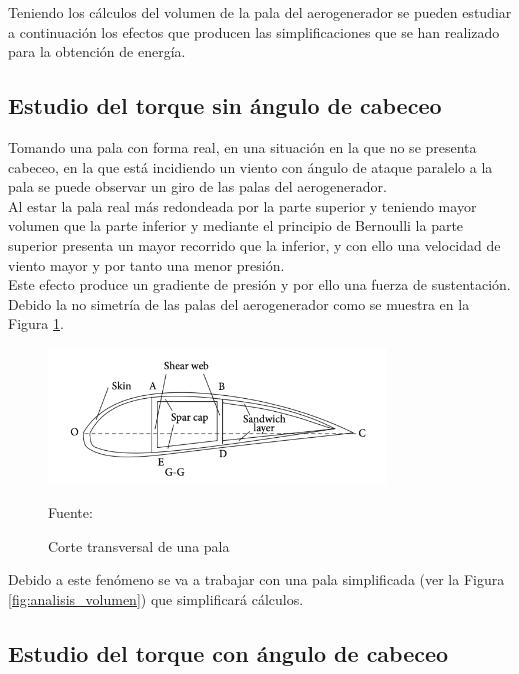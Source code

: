Teniendo los cálculos del volumen de la pala del aerogenerador se pueden estudiar a continuación los efectos que producen las simplificaciones que se han realizado para la obtención de energía.


\subsection{Estudio del torque sin ángulo de cabeceo}
\label{section:torque_pala_horizontal}

Tomando una pala con forma real, en una situación en la que no se presenta cabeceo, en la que está incidiendo un viento con ángulo de ataque paralelo a la pala se puede observar un giro de las palas del aerogenerador.\\

Al estar la pala real más redondeada por la parte superior y teniendo mayor volumen que la parte inferior y mediante el principio de Bernoulli la parte superior presenta un mayor recorrido que la inferior, y con ello una velocidad de viento mayor y por tanto una menor presión. \\

Este efecto produce un gradiente de presión y por ello una fuerza de sustentación. Debido la no simetría de las palas del aerogenerador como se muestra en la Figura \ref{fig:corte_transversal_pala}. \\

    \begin{figure}[H]
    \centering
    \includegraphics[width=0.8\textwidth]{images/Cross secction pala articulo.png}
    \caption{Corte transversal de una pala}
    Fuente: \cite{Zheng2014}
    \label{fig:corte_transversal_pala}
    \end{figure}


Debido a este fenómeno se va a trabajar con una pala simplificada (ver la Figura \ref{fig:analisis_volumen}) que simplificará cálculos. \\



\subsection{Estudio del torque con ángulo de cabeceo}
\label{section:torque_giro_inicial}

